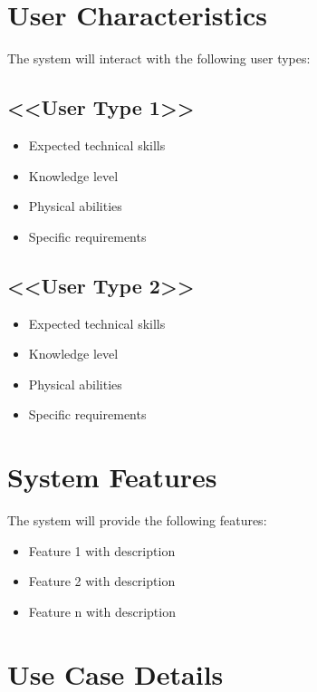 \documentclass[oneside]{utmsrs}
\begin{document}
\section{User Characteristics}
The system will interact with the following user types:

\subsection{<<User Type 1>>}
\begin{itemize}
    \item Expected technical skills
    \item Knowledge level
    \item Physical abilities
    \item Specific requirements
\end{itemize}

\subsection{<<User Type 2>>}
\begin{itemize}
    \item Expected technical skills
    \item Knowledge level
    \item Physical abilities
    \item Specific requirements
\end{itemize}

\section{System Features}
The system will provide the following features:
\begin{itemize}
    \item Feature 1 with description
    \item Feature 2 with description
    \item Feature n with description
\end{itemize}


\section{Use Case Details}
\end{document}

